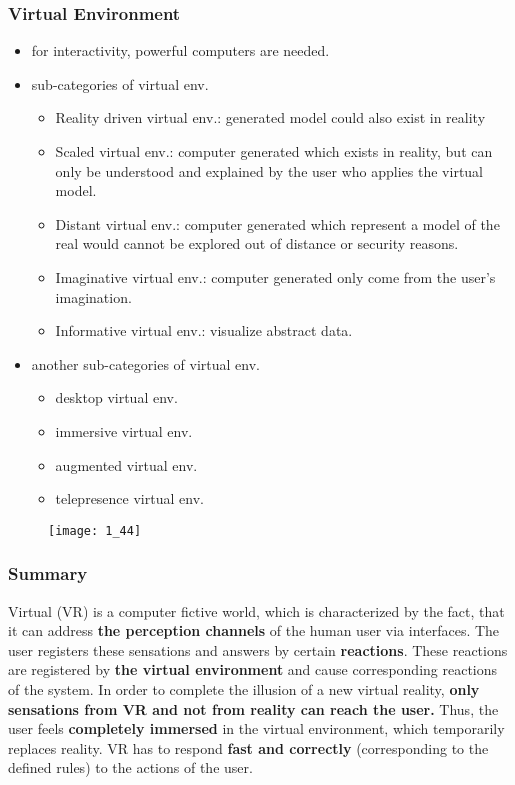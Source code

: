 \documentclass{standalone}
\begin{document}
\subsubsection*{Virtual Environment}

\begin{itemize}
	\item for interactivity, powerful computers are needed.
	\item sub-categories of virtual env.
		\begin{itemize}
			\item Reality driven virtual env.: generated model could also exist in reality
			\item Scaled virtual env.: computer generated which exists in reality, but can only be understood and explained by the user who applies the virtual model.
			\item Distant virtual env.: computer generated which represent a model of the real would cannot be explored out of distance or security reasons.
			\item Imaginative virtual env.: computer generated only come from the user's imagination.
			\item Informative virtual env.: visualize abstract data.
		\end{itemize}
	\item another sub-categories of virtual env.
		\begin{itemize}
			\item desktop virtual env.
			\item immersive virtual env.
			\item augmented virtual env.
			\item telepresence virtual env.
		\end{itemize}
\end{itemize}

\begin{figure}[H]
	\texttt{[image: 1\_44]}
\end{figure}

\subsubsection*{Summary}

Virtual (VR) is a computer fictive world, which is characterized by the fact, that it can address \textbf{the perception channels} of the human user via interfaces. The user registers these sensations and answers by certain \textbf{reactions}. These reactions are registered by \textbf{the virtual environment} and cause corresponding reactions of the system. In order to complete the illusion of a new virtual reality, \textbf{only sensations from VR and not from reality can reach the user.} Thus, the user feels \textbf{completely immersed} in the virtual environment, which temporarily replaces reality. VR has to respond \textbf{fast and correctly} (corresponding to the defined rules) to the actions of the user.
\end{document}
